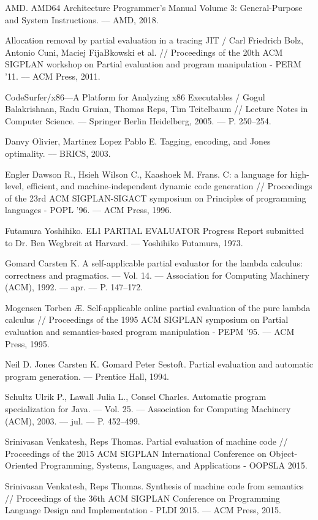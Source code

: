 \begin{thebibliography}{99}

  AMD. AMD64 Architecture Programmer’s Manual Volume 3: General-Purpose and System Instructions. –– AMD, 2018.
  
Allocation removal by partial evaluation in a tracing JIT / Carl Friedrich Bolz, Antonio Cuni, Maciej FijaBkowski et al. // Proceedings of the 20th ACM SIGPLAN workshop on Partial evaluation and program manipulation - PERM '11. –– ACM Press, 2011.

CodeSurfer/x86—A Platform for Analyzing x86 Executables / Gogul Balakrishnan, Radu Gruian, Thomas Reps, Tim Teitelbaum // Lecture Notes in Computer Science. –– Springer Berlin Heidelberg, 2005. –– P. 250–254.

Danvy Olivier, Martinez Lopez Pablo E. Tagging, encoding, and Jones optimality. –– BRICS, 2003.

Engler Dawson R., Hsieh Wilson C., Kaashoek M. Frans. C: a language for high-level, efficient, and machine-independent dynamic code generation // Proceedings of the 23rd ACM SIGPLAN-SIGACT symposium on Principles of programming languages - POPL '96. –– ACM Press, 1996.

Futamura Yoshihiko. EL1 PARTIAL EVALUATOR Progress Report submitted to Dr. Ben Wegbreit at Harvard. –– Yoshihiko Futamura, 1973.

Gomard Carsten K. A self-applicable partial evaluator for the lambda calculus: correctness and pragmatics. –– Vol. 14. –– Association for Computing Machinery (ACM), 1992. –– apr. –– P. 147–172.

Mogensen Torben Æ. Self-applicable online partial evaluation of the pure lambda calculus // Proceedings of the 1995 ACM SIGPLAN symposium on Partial evaluation and semantics-based program manipulation - PEPM '95. –– ACM Press, 1995.

Neil D. Jones Carsten K. Gomard Peter Sestoft. Partial evaluation and automatic program generation. –– Prentice Hall, 1994.

Schultz Ulrik P., Lawall Julia L., Consel Charles. Automatic program specialization for Java. –– Vol. 25. –– Association for Computing Machinery (ACM), 2003. –– jul. –– P. 452–499.

Srinivasan Venkatesh, Reps Thomas. Partial evaluation of machine code // Proceedings of the 2015 ACM SIGPLAN International Conference on Object-Oriented Programming, Systems, Languages, and Applications - OOPSLA 2015. 

Srinivasan Venkatesh, Reps Thomas. Synthesis of machine code from semantics // Proceedings of the 36th ACM SIGPLAN Conference on Programming Language Design and Implementation - PLDI 2015. –– ACM Press, 2015. 
  
\end{thebibliography}
  
